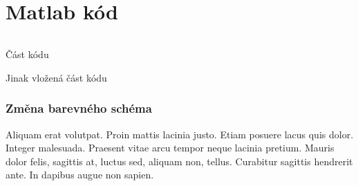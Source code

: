 \documentclass{article}
\begin{document}
\section{Matlab kód}

\begin{listing}[H]
    \inputminted[firstline=1, lastline=10]{matlab}{appendices/week7.m}
    \caption{Část kódu}
\end{listing}

\begin{listing}[H]
    
    \caption{Jinak vložená část kódu}
\end{listing}


\subsubsection{Změna barevného schéma}
\par Aliquam erat volutpat. Proin mattis lacinia justo. Etiam posuere lacus quis dolor. Integer malesuada. Praesent vitae arcu tempor neque lacinia pretium. Mauris dolor felis, sagittis at, luctus sed, aliquam non, tellus. Curabitur sagittis hendrerit ante. In dapibus augue non sapien.
\end{document}

